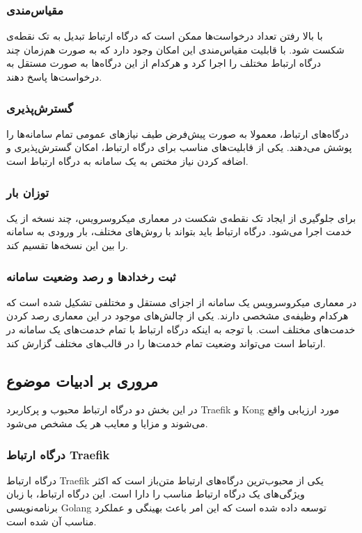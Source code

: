 \subsubsection{مقیاس‌مندی}
با بالا رفتن تعداد درخواست‌ها ممکن است که درگاه ارتباط تبدیل به تک نقطه‌ی شکست
شود. با قابلیت مقیاس‌مندی این امکان وجود دارد که به صورت هم‌زمان چند درگاه ارتباط مختلف را اجرا کرد و هر‌کدام از این درگاه‌ها به صورت مستقل به درخواست‌ها پاسخ دهند.

\subsubsection{گسترش‌پذیری}
درگاه‌های ارتباط، معمولا به صورت پیش‌فرض طیف نیازهای عمومی تمام سامانه‌ها را پوشش می‌دهند. یکی از قابلیت‌های مناسب برای درگاه ارتباط، امکان گسترش‌پذیری و اضافه کردن نیاز مختص به یک سامانه به درگاه ارتباط است.

\subsubsection{توزان بار}
برای جلوگیری از ایجاد تک نقطه‌ی شکست در معماری میکروسرویس، چند نسخه از یک خدمت اجرا می‌شود. درگاه ارتباط باید بتواند با روش‌های مختلف، بار ورودی به سامانه را بین این نسخه‌ها تقسیم کند.

\subsubsection{ثبت رخداد‌ها و رصد وضعیت سامانه}
در معماری میکروسرویس یک سامانه از اجزای مستقل و مختلفی تشکیل شده است که هر‌کدام وظیفه‌ی مشخصی دارند. یکی از چالش‌های موجود در این معماری رصد کردن خدمت‌های مختلف است. با توجه به اینکه درگاه ارتباط با تمام خدمت‌های یک سامانه در ارتباط است می‌تواند وضعیت تمام خدمت‌ها را در قالب‌های مختلف گزارش کند.


\subsection{مروری بر ادبیات موضوع}\label{subsec:sources_literature}
در این بخش دو درگاه ارتباط محبوب و پرکاربرد Traefik
\cite{Traefik}
و Kong
\cite{Kong}
مورد ارزیابی واقع می‌شوند و مزایا و معایب هر یک مشخص می‌شود.

\subsubsection{درگاه ارتباط Traefik}
درگاه ارتباط Traefik یکی از محبوب‌ترین درگاه‌های ارتباط متن‌باز است که اکثر ویژگی‌های یک درگاه ارتباط مناسب را دارا است. این درگاه ارتباط، با زبان برنامه‌نویسی Golang توسعه داده شده است که این امر باعث بهینگی و عملکرد مناسب آن شده است.

